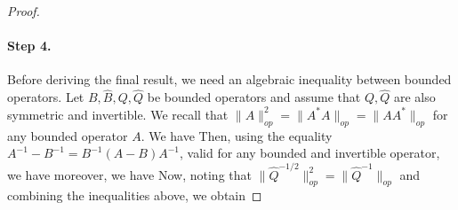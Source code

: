 \begin{proof}
\paragraph{Step 4.}
Before deriving the final result, we need an algebraic inequality between bounded operators. Let $B,\hat{B},Q,\hat{Q}$ be bounded operators and assume that $Q,\hat{Q}$ are also symmetric and invertible. We recall that $\|A\|^2_{op} = \|A^*A\|_{op} = \|AA^*\|_{op}$ for any bounded operator $A$. We have
Then, using the equality $A^{-1} - B^{-1} = B^{-1}(A - B)A^{-1}$, valid for any bounded and invertible operator, we have
moreover, we have
Now, noting that $\|\hat{Q}^{-1/2}\|^2_{op} = \|\hat{Q}^{-1}\|_{op}$ and combining the inequalities above, we obtain


\end{proof}
